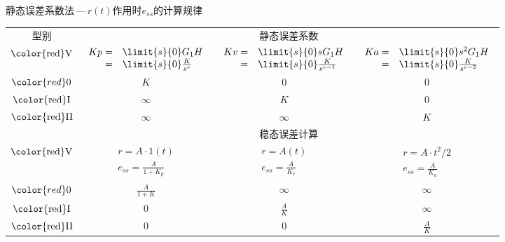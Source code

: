 \documentclass[handout,cjkutf8,table,aspectratio=1610]{beamer} %
\begin{document}
\begin{frame}{静态误差系数法\,---\,$r(t)$作用时$e_{ss}$的计算规律}

{\fontsize{11pt}{16pt}\selectfont
\begin{table}
\begin{tabular*}{\textwidth}{cccc}
型别&\multicolumn{3}{c}{\alert{静态误差系数}}\\
$\mathrm{\color{red}V}$&$\begin{array}{rl}Kp=&\limit{s}{0}G_1H\\=&\limit{s}{0}\frac{K}{s^v}\end{array}$
&$\begin{array}{rl}Kv=&\limit{s}{0}sG_1H\\=&\limit{s}{0}\frac{K}{s^{v-1}}\end{array}$
&$\begin{array}{rl}Ka=&\limit{s}{0}s^2G_1H\\=&\limit{s}{0}\frac{K}{s^{v-2}}\end{array}$\\
$\color{red}0$&$K$&$0$&$0$\\
$\mathrm{\color{red}I}$&$\infty$&$K$&$0$\\
$\mathrm{\color{red}II}$&$\infty$&$\infty$&$K$\\
&\multicolumn{3}{c}{\alert{稳态误差计算}}\\
$\mathrm{\color{red}V}$&$\begin{array}{l} r=A\cdot1(t)\\e_{ss}=\frac{A}{1+K_p}\end{array}$
&$\begin{array}{l} r=A(t)\\e_{ss}=\frac{A}{K_v}\end{array}$
&$\begin{array}{l}r=A\cdot t^2/2\\e_{ss}=\frac{A}{K_a}\end{array}$\\
$\color{red}0$&$\frac{A}{1+K}$&$\infty$&$\infty$\\
$\mathrm{\color{red}I}$&$0$&$\frac{A}{K}$&$\infty$\\
$\mathrm{\color{red}II}$&$0$&$0$&$\frac{A}{K}$
\end{tabular*}
\end{table}}
\end{frame}
\end{document}
